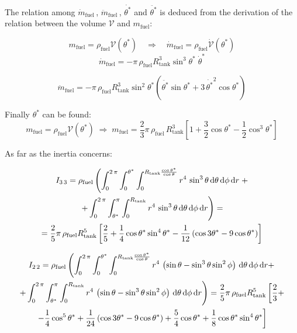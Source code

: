 The relation among $\dot{m}_{\text{fuel}}\,$, $\ddot{m}_{\text{fuel}}\, $, $\dot{\theta^*} $ and $\ddot{\theta^*} $ is deduced from the derivation of the relation between the volume $\mathcal{V}$ and $m_{\text{fuel}}$:

\begin{equation*}
	m_{\text{fuel}}=\rho_{\text{fuel}}\mathcal{V}(\theta^*) \quad \Rightarrow \quad \dot{m}_{\text{fuel}}=\rho_{\text{fuel}}\dot{\mathcal{V}}(\theta^*)
\end{equation*}
\begin{equation}
	\dot{m}_{\text{fuel}} = -\pi\,\rho_{\text{fuel}} R_{\text{tank}}^3 \sin^3{\theta^*}\;\dot{\theta}^*
\end{equation}

\begin{equation}
	\ddot{m}_{\text{fuel}} = -\pi\,\rho_{\text{fuel}} R_{\text{tank}}^3 \sin^2{\theta^*}\left( \ddot{\theta^*}\sin{\theta^*} + 3\, \dot{\theta^*}^2\cos{\theta^*}\right)
\end{equation}

Finally $\theta^*$ can be found:
\begin{equation}
	m_{\text{fuel}}=\rho_{\text{fuel}}\mathcal{V}(\theta^*) \; \Rightarrow \; m_{\text{fuel}} = \frac{2}{3}\pi\, \rho_{\text{fuel}}\,R_{\text{tank}}^3\left[1+\frac{3}{2}\cos{\theta^*}- \frac{1}{2}\cos^3{\theta^*}\right]
\end{equation}

As far as the inertia concerns:

\begin{multline}
	I_{3\,3} = \rho_{\text{fuel}} \left(\int_{0}^{2\,\pi}\int_{0}^{\theta^*}\int_{0}^{R_{\text{tank}}\frac{\cos{\theta^*}}{\cos{\theta}}} r^4\,\sin^3{\theta}\,\text{d}\theta\,\text{d}\phi\,\text{d}r  \vspace{3pt}\right.+\\
	\left.+ \int_{0}^{2\,\pi}\int_{\theta^*}^{\pi}\int_{0}^{R_{\text{tank}}} r^4\,\sin^3{\theta}\,\text{d}\theta\,\text{d}\phi\,\text{d}r\right)  =\\
	= \frac{2}{5}\pi\,\rho_{\text{fuel}}R^5_{\text{tank}}\left[\frac{2}{5}  + \frac{1}{4}\cos{\theta^*}\sin^4{\theta^*} -\frac{1}{12}\left(\cos{3\theta^*} - 9\cos{\theta^*}\right)\right]
\end{multline}

\begin{multline}
	I_{2\,2} =\rho_{\text{fuel}} \left(\int_{0}^{2\,\pi}\int_{0}^{\theta^*}\int_{0}^{R_{\text{tank}}\frac{\cos{\theta^*}}{\cos{\theta}}} r^4\,\left(\sin{\theta}-\sin^3{\theta}\sin^2{\phi}\right)\,\text{d}\theta\,\text{d}\phi\,\text{d}r + \vspace{3pt}\right.\\
	\left.+ \int_{0}^{2\,\pi}\int_{\theta^*}^{\pi}\int_{0}^{R_{\text{tank}}} r^4\,\left(\sin{\theta}-\sin^3{\theta}\sin^2{\phi}\right)\,\text{d}\theta\,\text{d}\phi\,\text{d}r\right) =
	\frac{2}{5}\pi\,\rho_{\text{fuel}}R^5_{\text{tank}}\left[\frac{2}{3} +\right.\\
	\left.- \frac{1}{4}\cos^5{\theta^*}  +\frac{1}{24}\left(\cos{3\theta^*} -9\cos{\theta^*}\right)  +\frac{5}{4}\cos{\theta^*} +\frac{1}{8} \cos{\theta^*}\sin^4{\theta^*}\right]
\end{multline}

